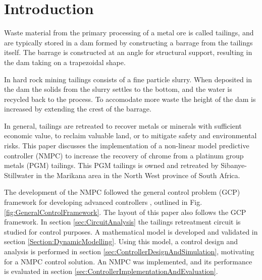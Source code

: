 \documentclass[preprint,authoryear,12pt]{elsarticle}
\begin{document}

\section{Introduction}\label{sec:background}
Waste material from the primary processing of a metal ore is called tailings, and are typically stored in a dam formed by constructing a barrage from the tailings itself. The barrage is constructed at an angle for structural support, resulting in the dam taking on a trapezoidal shape. 

In hard rock mining tailings consists of a fine particle slurry. When deposited in the dam the solids from the slurry settles to the bottom, and the water is recycled back to the process. To accomodate more waste the height of the dam is increased by extending the crest of the barrage.  

In general, tailings are retreated to recover metals or minerals with sufficient economic value, to reclaim valuable land, or to mitigate safety and environmental risks. This paper discusses the implementation of a non-linear model predictive controller (NMPC) to increase the recovery of chrome from a platinum group metals (PGM) tailings. This PGM tailings is owned and retreated by Sibanye-Stillwater in the Marikana area in the North West province of South Africa.

The development of the NMPC followed the general control problem (GCP) framework for developing advanced controllers \citep{Craig1997, CraigAndHenning2000}, outlined in Fig. \ref{fig:GeneralControlFramework}. The layout of this paper also follows the GCP framework. In section \ref{sec:CircuitAnalysis} the tailings retreatment circuit is studied for control purposes. A mathematical model is developed and validated in section \ref{Section:DynamicModelling}. Using this model, a control design and analysis is performed in section \ref{sec:ControllerDesignAndSimulation}, motivating for a NMPC control solution. An NMPC was implemented, and its performance is evaluated in section \ref{sec:ControllerImplementationAndEvaluation}.
\end{document}
